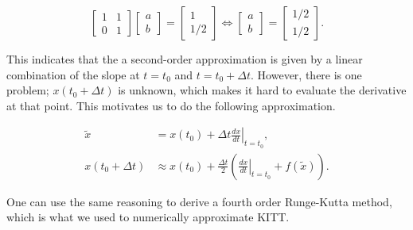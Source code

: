 \documentclass[11pt,titlepage]{report}
\begin{document}
\begin{appendices}
\begin{equation}
	\begin{bmatrix}
		1 & 1 \\
		0 & 1 
	\end{bmatrix} \begin{bmatrix}
		a \\
		b 
	\end{bmatrix} = \begin{bmatrix}
		1 \\
		1/2
	\end{bmatrix} \Leftrightarrow \begin{bmatrix}
		a \\
		b
	\end{bmatrix} = \begin{bmatrix}
		1/2 \\ 
		1/2
	\end{bmatrix}.
\end{equation}

This indicates that the a second-order approximation is given by a linear combination of the slope at $t=t_0$ and $t=t_0+\Delta t$. However, there is one problem; $x(t_0 + \Delta t)$ is unknown, which makes it hard to evaluate the derivative at that point. This motivates us to do the following approximation.

\begin{align}
	\tilde{x} &= x(t_0)+ \Delta t \left. \frac{dx}{dt} \right|_{t=t_0}, \\
	x(t_0+\Delta t) &\approx x(t_0) + \frac{\Delta t}{2}\left(\left. \frac{dx}{dt} \right|_{t=t_0} + f(\tilde{x})\right).
\end{align}

One can use the same reasoning to derive a fourth order Runge-Kutta method, which is what we used to numerically approximate KITT. 


\end{appendices}
\end{document}
